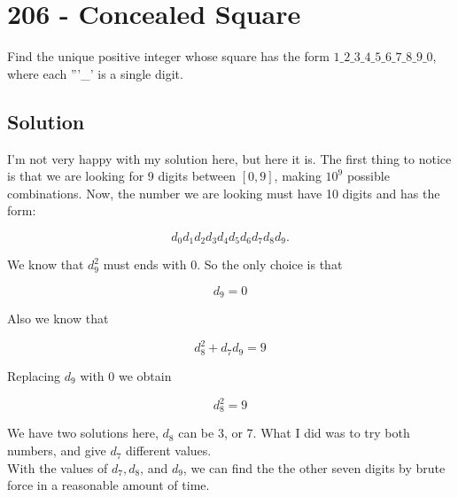 \chapter*{206 - Concealed Square}

Find the unique positive integer whose square has the form $1\_2\_3\_4\_5\_6\_7\_8\_9\_0$,
where each '''\_' is a single digit.

\section*{Solution}

I'm not very happy with my solution here, but here it is. The first thing to notice is that we are looking for 9 digits between $[0,9]$, making $10^9$ possible combinations. Now, the number we are looking must have 10 digits and has the form:

$$
d_0d_1d_2d_3d_4d_5d_6d_7d_8d_9.
$$

We know that $d_9^2$ must ends with $0$. So the only choice is that

$$
d_9 = 0
$$

Also we know that 

$$
d_8^2 + d_7d_9 = 9
$$

Replacing $d_9$ with 0 we obtain

$$
d_8^2 = 9
$$

We have two solutions here, $d_8$ can be 3, or 7. What I did was to try both numbers, and give $d_7$ different values.\\

With the values of $d_7,d_8$, and $d_9$, we can find the the other seven digits by brute force in a reasonable amount of time. 